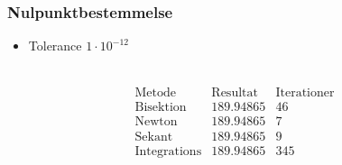 \begin{frame}
\frametitle{Nulpunktbestemmelse}
\begin{itemize}
\item Tolerance $1\cdot10^{-12}$
\end{itemize}
\phantom{H} \\
\centering
$$\begin{array}{l|c|c}
\text{Metode} & \text{Resultat} & \text{Iterationer}\\
\hline
\text{Bisektion}	& 189.94865 & 46\\
\text{Newton}		& 189.94865 & 7\\
\text{Sekant}		& 189.94865 & 9\\
\text{Integrations}	& 189.94865 & 345
\end{array}$$
\end{frame}